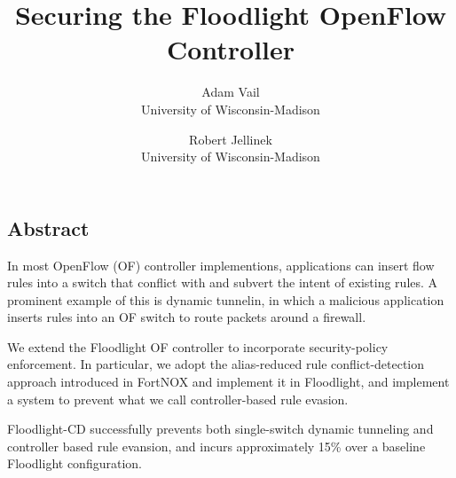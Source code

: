 \documentclass[letterpaper,twocolumn,10pt]{article}
\begin{document}
\date{}

\title{\Large \bf Securing the Floodlight OpenFlow Controller}

\author{
{\rm Adam Vail}\\
University of Wisconsin-Madison
\and
{\rm Robert Jellinek}\\
University of Wisconsin-Madison
} %

\maketitle

\thispagestyle{empty}


\subsection*{Abstract}
In most OpenFlow (OF) controller implementions, applications can insert flow rules into a switch that conflict with and subvert the intent of existing rules. A prominent example of this is dynamic tunnelin, in which a malicious application inserts rules into an OF switch to route packets around a firewall. 

We extend the Floodlight OF controller to incorporate security-policy enforcement. In particular, we adopt the alias-reduced rule conflict-detection approach introduced in FortNOX and implement it in Floodlight, and implement a system to prevent what we call controller-based rule evasion. 

Floodlight-CD successfully prevents both single-switch dynamic tunneling and controller based rule evansion, and incurs approximately 15\% over a baseline Floodlight configuration.





%

%

% 


{\footnotesize 
}


\end{document}
